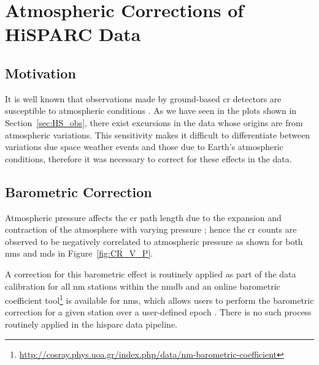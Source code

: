 
\section{Atmospheric Corrections of HiSPARC Data}\label{sec:HS_standardisation}

\subsection{Motivation}

It is well known that observations made by ground-based \gls{cr} detectors are susceptible to atmospheric conditions \citep{dorman_theory_2004,dorman_cosmic_2010,berkova_temperature_2011,de_mendonca_analysis_2013,paschalis_online_2013}. As we have seen in the plots shown in Section~\ref{sec:HS_obs}, there exist excursions in the data whose origins are from atmospheric variations. This sensitivity makes it difficult to differentiate between variations due space weather events and those due to Earth's atmospheric conditions, therefore it was necessary to correct for these effects in the data.



\subsection{Barometric Correction}\label{sec:HS_P_corr}


Atmospheric pressure affects the \gls{cr} path length due to the expansion and contraction of the atmosphere with varying pressure \citep{dorman_theory_1972, paschalis_online_2013}; hence the \gls{cr} counts are observed to be negatively correlated to atmospheric pressure as shown for both \glspl{nm} and \glspl{md} in Figure~\ref{fig:CR_V_P}. 

A correction for this barometric effect is routinely applied as part of the data calibration for all \gls{nm} stations within the \gls{nmdb} and an online barometric coefficient tool\footnote{\url{http://cosray.phys.uoa.gr/index.php/data/nm-barometric-coefficient}} is available for \glspl{nm}, which allows users to perform the barometric correction for a given station over a user-defined epoch \citep{paschalis_online_2013}. There is no such process routinely applied in the \gls{hisparc} data pipeline.



